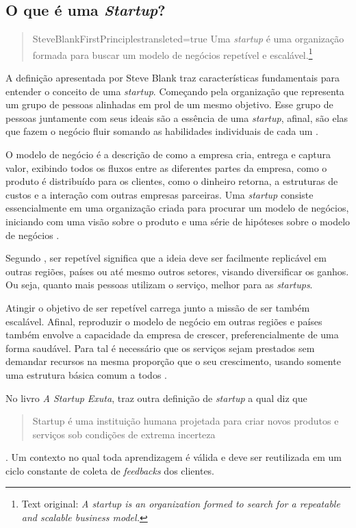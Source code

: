\subsection{O que é uma \textit{Startup}?}
\label{sec:OQueEUmaStartup}

\begin{quotation}{SteveBlankFirstPrinciples}{transleted=true}
Uma \textit{startup} é uma organização formada para buscar um modelo de 
negócios repetível e escalável.\footnote{Text original: \textit{A startup is an
organization formed to search for a repeatable and scalable business model.}}
\end{quotation}

A definição apresentada por Steve Blank traz características
fundamentais para entender o conceito de uma \textit{startup}. Começando
pela organização que representa um grupo de pessoas alinhadas em prol
de um mesmo objetivo. Esse grupo de pessoas juntamente com seus ideais
são a essência de uma \textit{startup}, afinal, são elas que fazem
o negócio fluir somando as habilidades individuais de cada um
\cite{ARevolucaoDasStartups}.

O modelo de negócio é a descrição de como a empresa cria, entrega e captura
valor, exibindo todos os fluxos entre as diferentes partes da empresa,
como o produto é distribuído para os clientes, como o dinheiro retorna, a
estruturas de custos e a interação com outras empresas parceiras. Uma
\textit{startup} consiste essencialmente em uma organização criada para
procurar um modelo de negócios, iniciando com uma visão sobre o produto e
uma série de hipóteses sobre o modelo de negócios
\cite{SteveBlankFirstPrinciples}.

Segundo , ser repetível significa que 
a ideia deve ser facilmente replicável em outras regiões, países ou até
mesmo outros setores, visando diversificar os ganhos. Ou seja, quanto mais
pessoas utilizam o serviço, melhor para as \textit{startups}.

Atingir o objetivo de ser repetível carrega junto a missão de ser também
escalável. Afinal, reproduzir o modelo de negócio em outras regiões e países
também envolve a capacidade da empresa de crescer, preferencialmente de uma
forma saudável. Para tal é necessário que os serviços sejam prestados sem
demandar recursos na mesma proporção que o seu crescimento, usando somente 
uma estrutura básica comum a todos \cite{CassioSpina}.

No livro \textit{A Startup Exuta},  traz outra
definição de \textit{startup} a qual diz que \begin{quote}Startup é uma instituição
humana projetada para criar novos produtos e serviços sob condições de extrema
incerteza\end{quote}. Um contexto no qual toda aprendizagem é válida e deve ser
reutilizada em um ciclo constante de coleta de \textit{feedbacks} dos clientes.

